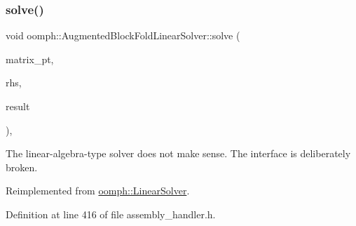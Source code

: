 \mbox{\label{classoomph_1_1AugmentedBlockFoldLinearSolver_afdea4d6668393ad1cccc810b81fdc957}} 
\subsubsection{\texorpdfstring{solve()}{solve()}\hspace{0.1cm}{\footnotesize\ttfamily [2/3]}}
{\footnotesize\ttfamily void oomph\+::\+Augmented\+Block\+Fold\+Linear\+Solver\+::solve (\begin{DoxyParamCaption}\item[{\hyperlink{classoomph_1_1DoubleMatrixBase}{Double\+Matrix\+Base} $\ast$const \&}]{matrix\+\_\+pt,  }\item[{const \hyperlink{classoomph_1_1DoubleVector}{Double\+Vector} \&}]{rhs,  }\item[{\hyperlink{classoomph_1_1DoubleVector}{Double\+Vector} \&}]{result }\end{DoxyParamCaption})\hspace{0.3cm}{\ttfamily [inline]}, {\ttfamily [virtual]}}



The linear-\/algebra-\/type solver does not make sense. The interface is deliberately broken. 



Reimplemented from \hyperlink{classoomph_1_1LinearSolver_a546c09822d18191df14caed864c04c09}{oomph\+::\+Linear\+Solver}.



Definition at line 416 of file assembly\+\_\+handler.\+h.

\mbox{\label{classoomph_1_1AugmentedBlockFoldLinearSolver_ae7f5f1459fef68479b39f0d1a1dce243}} 
